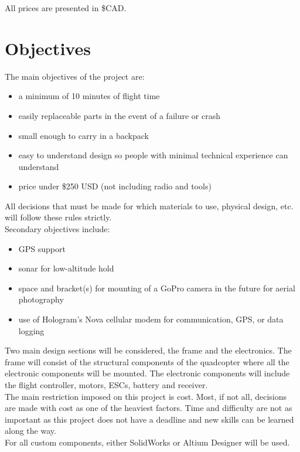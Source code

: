 \documentclass[12pt]{article}
\begin{document}
All prices are presented in \$CAD.

\section{Objectives}

The main objectives of the project are:
\renewcommand{\labelitemi}{\textperiodcentered}
\begin{itemize}
\item a minimum of 10 minutes of flight time
\item easily replaceable parts in the event of a failure or crash
\item small enough to carry in a backpack
\item easy to understand design so people with minimal technical experience can understand
\item price under \$250 USD (not including radio and tools)
\end{itemize}

All decisions that must be made for which materials to use, physical design, etc. will follow these rules strictly.
\\

Secondary objectives include:
\renewcommand{\labelitemi}{\textperiodcentered}
\begin{itemize}
\item GPS support
\item sonar for low-altitude hold
\item space and bracket(s) for mounting of a GoPro camera in the future for aerial photography
\item use of Hologram's Nova cellular modem for communication, GPS, or data logging
\end{itemize}

Two main design sections will be considered, the frame and the electronics. The frame will consist of the structural components of the quadcopter where all the electronic components will be mounted. The electronic components will include the flight controller, motors, ESCs, battery and receiver. 
\\

The main restriction imposed on this project is cost. Most, if not all, decisions are made with cost as one of the heaviest factors. Time and difficulty are not as important as this project does not have a deadline and new skills can be learned along the way.
\\

For all custom components, either SolidWorks or Altium Designer will be used.
\end{document}
